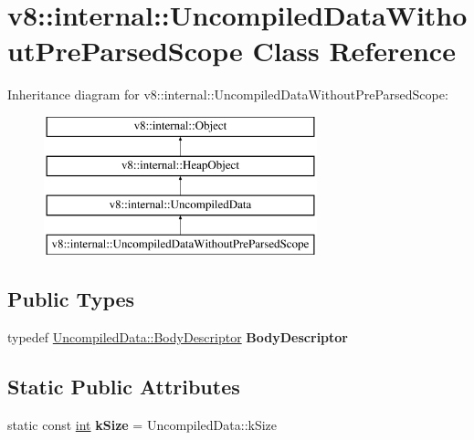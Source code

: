 \hypertarget{classv8_1_1internal_1_1UncompiledDataWithoutPreParsedScope}{}\section{v8\+:\+:internal\+:\+:Uncompiled\+Data\+Without\+Pre\+Parsed\+Scope Class Reference}
\label{classv8_1_1internal_1_1UncompiledDataWithoutPreParsedScope}
Inheritance diagram for v8\+:\+:internal\+:\+:Uncompiled\+Data\+Without\+Pre\+Parsed\+Scope\+:\begin{figure}[H]
\begin{center}
\leavevmode
\includegraphics[height=4.000000cm]{classv8_1_1internal_1_1UncompiledDataWithoutPreParsedScope}
\end{center}
\end{figure}
\subsection*{Public Types}
\begin{DoxyCompactItemize}
\item 
\mbox{\label{classv8_1_1internal_1_1UncompiledDataWithoutPreParsedScope_a0fe2e8ad4b8201509cda4fce8353f5b9}} 
typedef \mbox{\hyperlink{classv8_1_1internal_1_1FixedBodyDescriptor}{Uncompiled\+Data\+::\+Body\+Descriptor}} {\bfseries Body\+Descriptor}
\end{DoxyCompactItemize}
\subsection*{Static Public Attributes}
\begin{DoxyCompactItemize}
\item 
\mbox{\label{classv8_1_1internal_1_1UncompiledDataWithoutPreParsedScope_a468a444d15d804e3b52e5f44833c6d42}} 
static const \mbox{\hyperlink{classint}{int}} {\bfseries k\+Size} = Uncompiled\+Data\+::k\+Size
\end{DoxyCompactItemize}
